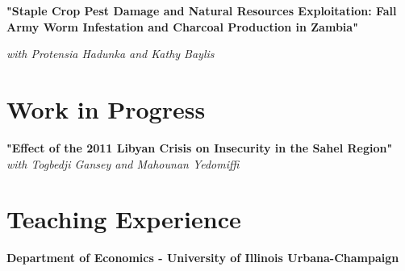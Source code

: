\documentclass[letterpaper,11pt]{article}
\begin{document}
    \hspace{3mm}
    \textbf{"Staple Crop Pest Damage and Natural Resources Exploitation: Fall Army Worm Infestation and Charcoal Production in Zambia"} 
    
    \hspace{3mm}
    \textit{with Protensia Hadunka and Kathy Baylis}

\section{Work in Progress}

\begin{adjustwidth}{3mm}{0mm}
\textbf{"Effect of the 2011 Libyan Crisis on Insecurity in the Sahel Region"}  \textit{with Togbedji Gansey and Mahounan Yedomiffi}
\end{adjustwidth}

\section{Teaching Experience}
\begin{adjustwidth}{3mm}{0mm}
\textbf{Department of Economics - University of Illinois Urbana-Champaign}
\end{adjustwidth}
\end{document}
